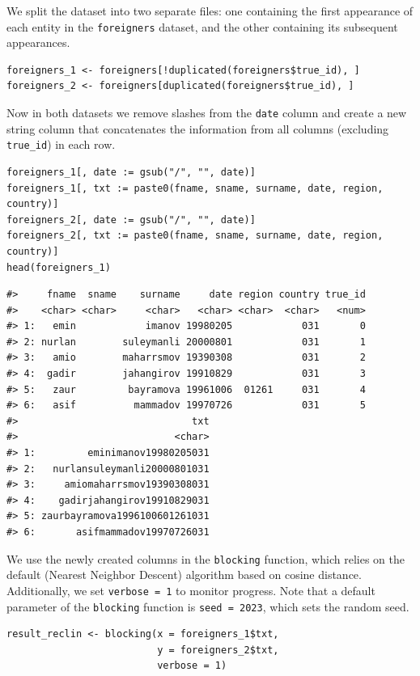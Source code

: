 We split the dataset into two separate files: one containing the first appearance of each entity in the \texttt{foreigners} dataset, and the other containing its subsequent appearances.

\begin{verbatim}
foreigners_1 <- foreigners[!duplicated(foreigners$true_id), ]
foreigners_2 <- foreigners[duplicated(foreigners$true_id), ]
\end{verbatim}

Now in both datasets we remove slashes from the \texttt{date} column and create a new string column that concatenates the information from all columns (excluding \texttt{true\_id}) in each row.

\begin{verbatim}
foreigners_1[, date := gsub("/", "", date)]
foreigners_1[, txt := paste0(fname, sname, surname, date, region, country)]
foreigners_2[, date := gsub("/", "", date)]
foreigners_2[, txt := paste0(fname, sname, surname, date, region, country)]
head(foreigners_1)
\end{verbatim}

\begin{verbatim}
#>     fname  sname    surname     date region country true_id
#>    <char> <char>     <char>   <char> <char>  <char>   <num>
#> 1:   emin            imanov 19980205            031       0
#> 2: nurlan        suleymanli 20000801            031       1
#> 3:   amio        maharrsmov 19390308            031       2
#> 4:  gadir        jahangirov 19910829            031       3
#> 5:   zaur         bayramova 19961006  01261     031       4
#> 6:   asif          mammadov 19970726            031       5
#>                              txt
#>                           <char>
#> 1:         eminimanov19980205031
#> 2:   nurlansuleymanli20000801031
#> 3:     amiomaharrsmov19390308031
#> 4:    gadirjahangirov19910829031
#> 5: zaurbayramova1996100601261031
#> 6:       asifmammadov19970726031
\end{verbatim}

We use the newly created columns in the \texttt{blocking} function, which relies on the default  (Nearest Neighbor Descent) algorithm based on cosine distance. Additionally, we set \texttt{verbose\ =\ 1} to monitor progress. Note that a default parameter of the \texttt{blocking} function is \texttt{seed\ =\ 2023}, which sets the random seed.

\begin{verbatim}
result_reclin <- blocking(x = foreigners_1$txt, 
                          y = foreigners_2$txt, 
                          verbose = 1)
\end{verbatim}

